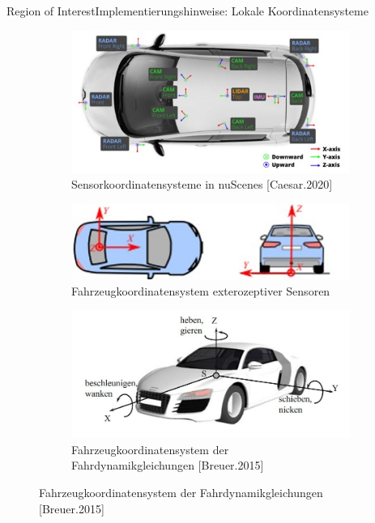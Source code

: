\documentclass[169, handout	]{THIbeamer} %
\begin{document}
	\begin{frame}{Region of Interest}{Implementierungshinweise: Lokale Koordinatensysteme}
		\begin{figure}
			\centering
    		\begin{subfigure}[b]{0.4\textwidth}
				\includegraphics[scale=0.4]{required/Sensorkoordinatensysteme.jpg}
				\caption{Sensorkoordinatensysteme in nuScenes [Caesar.2020]}
        		\label{ROS}
   		 	\end{subfigure}
   		 	\vfill
    		\begin{subfigure}[b]{0.4\textwidth}
				\includegraphics[scale=0.5]{required/Fahrzeugkoordinatensystem exterozeptiver Sensoren.jpg}
				\caption{Fahrzeugkoordinatensystem exterozeptiver Sensoren}
        		\label{ROS}
    		\end{subfigure}
    		\hspace{1.5 cm}
    		\begin{subfigure}[b]{0.4\textwidth}
				\includegraphics[scale=0.2]{required/Fahrzeugkoordinatensystem CoG.jpg}
				\caption{Fahrzeugkoordinatensystem der Fahrdynamikgleichungen [Breuer.2015]}
        		\label{ROS}
    		\end{subfigure}
		\end{figure}
		
	\end{frame}
\end{document}
